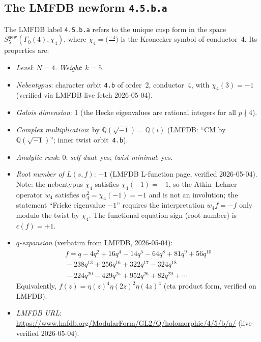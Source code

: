 \documentclass[12pt]{amsart}
\theoremstyle{definition}
\newcommand{\Q}{\mathbb{Q}}
\newcommand{\Gam}{\Gamma}
\newcommand{\lmfdb}[1]{\texttt{#1}}  %
\begin{document}
\subsection{The LMFDB newform \texttt{4.5.b.a}}

The LMFDB label \lmfdb{4.5.b.a} refers to the unique cusp form in the
space $S_5^{\mathrm{new}}(\Gam_0(4),\chi_4)$, where
$\chi_4 = \bigl(\tfrac{-4}{\cdot}\bigr)$ is the Kronecker symbol of
conductor~4.  Its properties are:

\begin{itemize}
  \item \emph{Level}: $N=4$. \emph{Weight}: $k=5$.
  \item \emph{Nebentypus}: character orbit \texttt{4.b} of order~2,
    conductor~4, with $\chi_4(3)=-1$ (verified via LMFDB live fetch
    2026-05-04).
  \item \emph{Galois dimension}: 1 (the Hecke eigenvalues are rational
    integers for all $p\nmid 4$).
  \item \emph{Complex multiplication}: by $\Q(\sqrt{-1})=\Q(i)$
    (LMFDB: ``CM by $\Q(\sqrt{-1})$''; inner twist orbit~\texttt{4.b}).
  \item \emph{Analytic rank}: 0; \emph{self-dual}: yes;
    \emph{twist minimal}: yes.
  \item \emph{Root number of $L(s,f)$}: $+1$ (LMFDB L-function page,
    verified 2026-05-04).  Note: the nebentypus $\chi_4$ satisfies
    $\chi_4(-1)=-1$, so the Atkin--Lehner operator $w_4$ satisfies
    $w_4^2 = \chi_4(-1) = -1$ and is not an involution; the
    statement ``Fricke eigenvalue $-1$'' requires the interpretation
    $w_4 f = -f$ only modulo the twist by $\chi_4$.  The functional
    equation sign (root number) is $\epsilon(f) = +1$.
  \item \emph{$q$-expansion} (verbatim from LMFDB, 2026-05-04):
    \begin{multline*}
      f = q - 4q^2 + 16q^4 - 14q^5 - 64q^8 + 81q^9 + 56q^{10}\\
          {} - 238q^{13} + 256q^{16} + 322q^{17} - 324q^{18}\\
          {} - 224q^{20} - 429q^{25} + 952q^{26} + 82q^{29} + \cdots
    \end{multline*}
    Equivalently, $f(z) = \eta(z)^4\eta(2z)^2\eta(4z)^4$ (eta product
    form, verified on LMFDB).
  \item \emph{LMFDB URL}: \url{https://www.lmfdb.org/ModularForm/GL2/Q/holomorphic/4/5/b/a/}
    (live-verified 2026-05-04).
\end{itemize}
\end{document}
